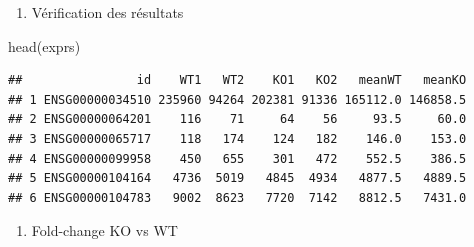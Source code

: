 \documentclass[
]{book}
\newenvironment{Shaded}{\begin{snugshade}}{\end{snugshade}}
\newcommand{\FunctionTok}[1]{\textcolor[rgb]{0.00,0.00,0.00}{#1}}
\newcommand{\NormalTok}[1]{#1}
\newcommand{\OtherTok}[1]{\textcolor[rgb]{0.56,0.35,0.01}{#1}}
\newcommand{\SpecialCharTok}[1]{\textcolor[rgb]{0.00,0.00,0.00}{#1}}
\newcommand{\StringTok}[1]{\textcolor[rgb]{0.31,0.60,0.02}{#1}}
\providecommand{\tightlist}{%
  \setlength{\itemsep}{0pt}\setlength{\parskip}{0pt}}
\begin{document}
\begin{Shaded}
\end{Shaded}

\begin{enumerate}
\def\labelenumi{\arabic{enumi}.}
\setcounter{enumi}{2}
\tightlist
\item
  Vérification des résultats
\end{enumerate}

\begin{Shaded}
\begin{Highlighting}[]
\FunctionTok{head}\NormalTok{(exprs) }
\end{Highlighting}
\end{Shaded}

\begin{verbatim}
##                id    WT1   WT2    KO1   KO2   meanWT   meanKO
## 1 ENSG00000034510 235960 94264 202381 91336 165112.0 146858.5
## 2 ENSG00000064201    116    71     64    56     93.5     60.0
## 3 ENSG00000065717    118   174    124   182    146.0    153.0
## 4 ENSG00000099958    450   655    301   472    552.5    386.5
## 5 ENSG00000104164   4736  5019   4845  4934   4877.5   4889.5
## 6 ENSG00000104783   9002  8623   7720  7142   8812.5   7431.0
\end{verbatim}

\begin{enumerate}
\def\labelenumi{\arabic{enumi}.}
\setcounter{enumi}{3}
\tightlist
\item
  Fold-change KO vs WT
\end{enumerate}

\begin{Shaded}
\end{Shaded}
\end{document}
